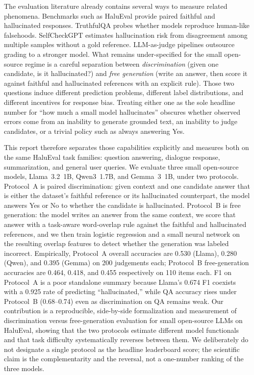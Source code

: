 \documentclass[11pt]{article}
\begin{document}
The evaluation literature already contains several ways to measure related
phenomena. Benchmarks such as HaluEval provide paired faithful and hallucinated
responses. TruthfulQA probes whether models reproduce human-like falsehoods.
SelfCheckGPT estimates hallucination risk from disagreement among multiple
samples without a gold reference. LLM-as-judge pipelines outsource grading to a
stronger model. What remains under-specified for the small open-source regime is
a careful separation between \emph{discrimination} (given one candidate, is it
hallucinated?) and \emph{free generation} (write an answer, then score it
against faithful and hallucinated references with an explicit rule). Those two
questions induce different prediction problems, different label distributions,
and different incentives for response bias. Treating either one as the sole
headline number for ``how much a small model hallucinates'' obscures whether
observed errors come from an inability to generate grounded text, an inability
to judge candidates, or a trivial policy such as always answering Yes.

This report therefore separates those capabilities explicitly and measures both
on the same HaluEval task families: question answering, dialogue response,
summarization, and general user queries. We evaluate three small open-source
models, Llama~3.2~1B, Qwen3~1.7B, and Gemma~3~1B, under two protocols.
Protocol~A is paired discrimination: given context and one candidate answer that
is either the dataset's faithful reference or its hallucinated counterpart, the
model answers Yes or No to whether the candidate is hallucinated. Protocol~B is
free generation: the model writes an answer from the same context, we score that
answer with a task-aware word-overlap rule against the faithful and hallucinated
references, and we then train logistic regression and a small neural network on
the resulting overlap features to detect whether the generation was labeled
incorrect. Empirically, Protocol~A overall accuracies are 0.530 (Llama), 0.280
(Qwen), and 0.395 (Gemma) on 200 judgements each; Protocol~B free-generation
accuracies are 0.464, 0.418, and 0.455 respectively on 110 items each. F1 on
Protocol~A is a poor standalone summary because Llama's 0.674 F1 coexists with a
0.925 rate of predicting ``hallucinated,'' while QA accuracy rises under
Protocol~B (0.68--0.74) even as discrimination on QA remains weak. Our
contribution is a reproducible, side-by-side formalization and measurement of
discrimination versus free-generation evaluation for small open-source LLMs on
HaluEval, showing that the two protocols estimate different model functionals
and that task difficulty systematically reverses between them. We deliberately
do not designate a single protocol as the headline leaderboard score; the
scientific claim is the complementarity and the reversal, not a one-number
ranking of the three models.
\end{document}
